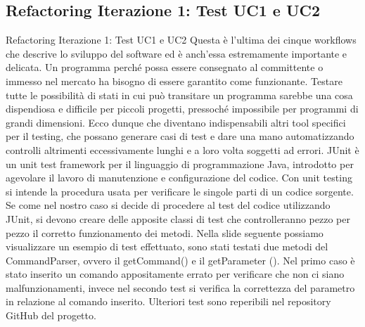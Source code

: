 \subsection {Refactoring Iterazione 1: Test UC1 e UC2}
 \begin{frame}[allowframebreaks] {Refactoring Iterazione 1: Test UC1 e UC2}
   Questa è l'ultima dei cinque workflows che descrive lo sviluppo del software ed è anch'essa estremamente importante e delicata. Un programma perché possa 
   essere consegnato al committente o immesso nel mercato ha bisogno di essere garantito come funzionante. Testare tutte le possibilità di stati in cui può 
   transitare un programma sarebbe una cosa dispendiosa e difficile per piccoli progetti, pressoché impossibile per programmi di grandi dimensioni. Ecco dunque che 
   diventano indispensabili altri tool specifici per il testing, che possano generare casi di test e dare una mano automatizzando controlli altrimenti
   eccessivamente lunghi e a loro volta soggetti ad errori.
   \newline
   JUnit è un unit test framework per il linguaggio di programmazione Java, introdotto per agevolare il lavoro di manutenzione e configurazione del codice.
   \newline 
   Con unit testing si intende la procedura usata per verificare le singole parti di un codice sorgente.
   Se come nel nostro caso si decide di procedere al test del codice utilizzando JUnit, si devono creare delle apposite classi di test che controlleranno pezzo per   
   pezzo il corretto funzionamento dei metodi. 
   \newline
   Nella slide seguente possiamo visualizzare un esempio di test effettuato, sono stati testati due metodi del CommandParser, ovvero il getCommand() e il getParameter
   (). Nel primo caso è stato inserito un comando appositamente errato per verificare che non ci siano malfunzionamenti, invece nel secondo test si verifica la   
   correttezza del parametro in relazione al comando inserito. 
   \newline
   Ulteriori test sono reperibili nel repository  GitHub del progetto.
  
\end{frame}


